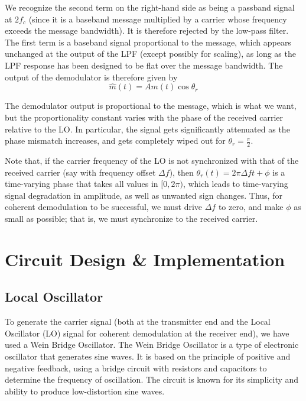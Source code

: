 \documentclass[conference]{IEEEtran}
\begin{document}
We recognize the second term on the right-hand side as being a passband signal at \(2f_c\) (since it is a baseband message multiplied by a carrier whose frequency exceeds the message bandwidth). It is therefore rejected by the low-pass filter. The first term is a baseband signal proportional to the message, which appears unchanged at the output of the LPF (except possibly for scaling), as long as the LPF response has been designed to be flat over the message bandwidth. The output of the demodulator is therefore given by
\[
    \hat{m}(t) = A m(t) \cos\theta_r 
\]

The demodulator output is proportional to the message, which is what we want, but the proportionality constant varies with the phase of the received carrier relative to the LO. In particular, the signal gets significantly attenuated as the phase mismatch increases, and gets completely wiped out for \(\theta_r = \frac{\pi}{2}\).

Note that, if the carrier frequency of the LO is not synchronized with that of the received carrier (say with frequency offset \(\Delta f\)), then \(\theta_r(t) = 2\pi \Delta f t + \phi\) is a time-varying phase that takes all values in \([0, 2\pi)\), which leads to time-varying signal degradation in amplitude, as well as unwanted sign changes. Thus, for coherent demodulation to be successful, we must drive \(\Delta f\) to zero, and make \(\phi\) as small as possible; that is, we must synchronize to the received carrier.


\section{Circuit Design \& Implementation}
\subsection{Local Oscillator}
To generate the carrier signal (both at the transmitter end and the Local Oscillator (LO) signal for coherent demodulation at the receiver end), we have used a Wein Bridge Oscillator. The Wein Bridge Oscillator is a type of electronic oscillator that generates sine waves. It is based on the principle of positive and negative feedback, using a bridge circuit with resistors and capacitors to determine the frequency of oscillation. The circuit is known for its simplicity and ability to produce low-distortion sine waves.
\end{document}
